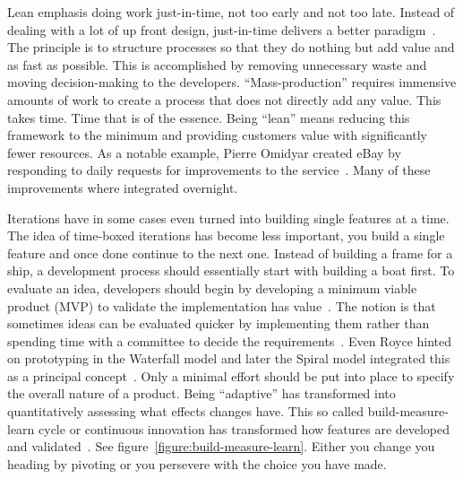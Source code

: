 \documentclass[english]{tktltiki2}
\begin{document}
Lean emphasis doing work just-in-time, not too early and not too late. Instead of dealing with a lot of up front design, just-in-time delivers a better paradigm~\cite{Pop02}. The principle is to structure processes so that they do nothing but add value and as fast as possible. This is accomplished by removing unnecessary waste and moving decision-making to the developers. “Mass-production” requires immensive amounts of work to create a process that does not directly add any value. This takes time. Time that is of the essence. Being “lean” means reducing this framework to the minimum and providing customers value with significantly fewer resources. As a notable example, Pierre Omidyar created eBay by responding to daily requests for improvements to the service~\cite{Pop02}. Many of these improvements where integrated overnight.

Iterations have in some cases even turned into building single features at a time. The idea of time-boxed iterations has become less important, you build a single feature and once done continue to the next one. Instead of building a frame for a ship, a development process should essentially start with building a boat first. To evaluate an idea, developers should begin by developing a minimum viable product (MVP) to validate the implementation has value~\cite{Rie11}. The notion is that sometimes ideas can be evaluated quicker by implementing them rather than spending time with a committee to decide the requirements~\cite{Pop02}. Even Royce hinted on prototyping in the Waterfall model and later the Spiral model integrated this as a principal concept~\cite{Roy70, Boe88}. Only a minimal effort should be put into place to specify the overall nature of a product. Being “adaptive” has transformed into quantitatively assessing what effects changes have. This so called build-measure-learn cycle or continuous innovation has transformed how features are developed and validated~\cite{Rie11}. See figure~\ref{figure:build-measure-learn}. Either you change you heading by pivoting or you persevere with the choice you have made.
\end{document}
